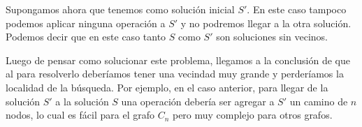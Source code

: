 Supongamos ahora que tenemos como solución inicial $S'$. En este caso tampoco podemos aplicar ninguna operación a $S'$ y no podremos llegar a la otra solución. Podemos decir que en este caso tanto $S$ como $S'$ son soluciones sin vecinos.

Luego de pensar como solucionar este problema, llegamos a la conclusión de que al para resolverlo deberíamos tener una vecindad muy grande y perderíamos la localidad de la búsqueda. Por ejemplo, en el caso anterior, para llegar de la solución $S'$ a la solución $S$ una operación debería ser agregar a $S'$ un camino de $n$ nodos, lo cual es fácil para el grafo $C_n$ pero muy complejo para otros grafos.